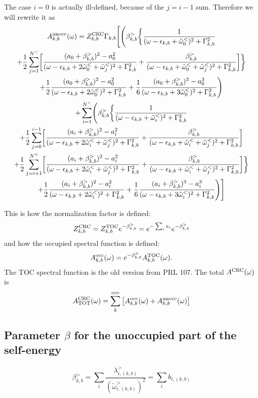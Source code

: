\documentclass[a4paper,12pt]{article}
\begin{document}
The case $i=0$ is actually ill-defined, because of the $j= i-1$ sum. Therefore we will rewrite it as
\begin{multline}
 A_{k,b}^\textnormal{unocc}(\omega) = Z_{k,b}^\textnormal{CRC} \Gamma_{k,b} \Biggl[ 
   \Biggl( \beta_{k,b}^> \biggl\{
 \frac1{(\omega - \epsilon_{k,b} + \tilde\omega_0^<)^2 + \Gamma_{k,b}^2}  \\ 
  + \frac12 \sum_{j=1}^{N^<} \biggl[ \frac{(a_0 + \beta_{k,b}^>)^2 - a_0^2 }
  {(\omega - \epsilon_{k,b} + 2 \tilde\omega_0^< + \tilde\omega_j^<)^2 + \Gamma_{k,b}^2} 
 + \frac{\beta_{k,b}^>}{(\omega - \epsilon_{k,b} + \tilde\omega_0^< + \tilde\omega_j^<)^2 + \Gamma_{k,b}^2}
 \biggr] \biggr\} \\
 + \frac12 \frac{(a_0 + \beta_{k,b}^>)^2 - a_0^2}{(\omega - \epsilon_{k,b} + 2 \tilde\omega_0^<)^2 + \Gamma_{k,b}^2} 
 + \frac16 \frac{(a_0 + \beta_{k,b}^>)^3 - a_0^3}{(\omega - \epsilon_{k,b} + 3 \tilde\omega_0^<)^2 + \Gamma_{k,b}^2} 
 \Biggr) \\
 + \sum_{i=1}^{N^<} \Biggl( \beta_{k,b}^> \biggl\{
 \frac1{(\omega - \epsilon_{k,b} + \tilde\omega_i^<)^2 + \Gamma_{k,b}^2}  \\ 
  + \frac12 \sum_{j=0}^{i-1} \biggl[ \frac{(a_i + \beta_{k,b}^>)^2 - a_i^2 }
  {(\omega - \epsilon_{k,b} + 2 \tilde\omega_i^< + \tilde\omega_j^<)^2 + \Gamma_{k,b}^2} 
 + \frac{\beta_{k,b}^>}{(\omega - \epsilon_{k,b} + \tilde\omega_i^< + \tilde\omega_j^<)^2 + \Gamma_{k,b}^2}  \biggr] \\ 
  + \frac12 \sum_{j=i+1}^{N^<} \biggl[ \frac{(a_i + \beta_{k,b}^>)^2 - a_i^2 }
  {(\omega - \epsilon_{k,b} + 2 \tilde\omega_i^< + \tilde\omega_j^<)^2 + \Gamma_{k,b}^2} 
 + \frac{\beta_{k,b}^>}{(\omega - \epsilon_{k,b} + \tilde\omega_i^< + \tilde\omega_j^<)^2 + \Gamma_{k,b}^2}
 \biggr] \biggr\} \\
 + \frac12 \frac{(a_i + \beta_{k,b}^>)^2 - a_i^2}{(\omega - \epsilon_{k,b} + 2 \tilde\omega_i^<)^2 + \Gamma_{k,b}^2} 
 + \frac16 \frac{(a_i + \beta_{k,b}^>)^3 - a_i^3}{(\omega - \epsilon_{k,b} + 3 \tilde\omega_i^<)^2 + \Gamma_{k,b}^2} 
 \Biggr) \Biggr]
\end{multline}


This is how the normalization factor is defined: 
\begin{equation}
  Z_{k,b}^\textnormal{CRC} = Z_{k,b}^\textnormal{TOC} e^{ - \beta_{k,b}^> } =  e^{ - \sum_i a_i }  e^{ - \beta_{k,b}^> } 
\end{equation}
and how the occupied spectral function is defined:
\begin{equation}
  A_{k,b}^\textnormal{occ}(\omega) = e^{ - \beta_{k,b}^> } A_{k,b}^\textnormal{TOC}(\omega) .
\end{equation}
The TOC spectral function is the old version from PRL 107. 
The total $A^\textnormal{CRC}(\omega)$ is 
\begin{equation}
   A_\textnormal{TOT}^\textnormal{CRC}(\omega) = \sum_k^\textnormal{occ} \left[ A_{k,b}^\textnormal{occ}(\omega) + A_{k,b}^\textnormal{unocc}(\omega) \right]
\end{equation}

\subsection{Parameter $\beta$ for the unoccupied part of the self-energy}

\begin{equation}
	\beta_{k,b}^>  = \sum_i \frac{\lambda_{i,(k,b)}^>}{(\tilde\omega_{i,(k,b)}^>)^2} = \sum_i b_{i,(k,b)}
\end{equation}
\end{document}
